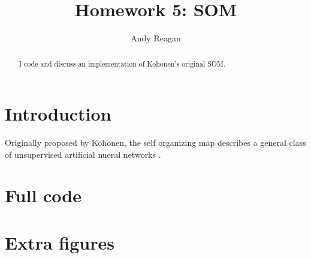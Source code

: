 \documentclass[pre,twocolumn,twoside,byrevtex,superscriptaddress]{revtex4}
\begin{document}




\title{\vspace{-2cm}Homework 5: SOM}
\author{Andy Reagan}

\begin{abstract}
I code and discuss an implementation of Kohonen's original SOM.
\end{abstract}

\maketitle


\section{Introduction}

Originally proposed by Kohonen, the self organizing map describes a general class of unsupervised artificial nueral networks \cite{kohonen1990self}.




\clearpage
\pagebreak




\clearpage
\pagebreak
\onecolumngrid

    \section*{Full code}

    

    

\clearpage
\pagebreak

    \section*{Extra figures}

\end{document}
